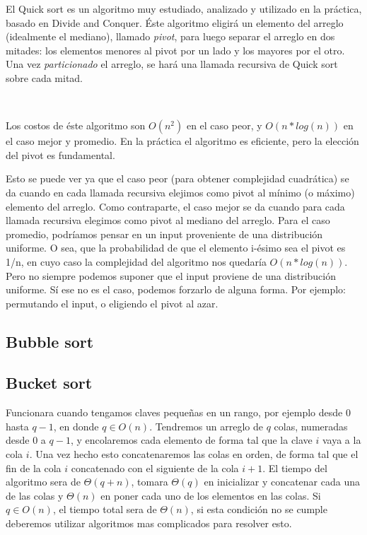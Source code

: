 El Quick sort es un algoritmo muy estudiado, analizado y utilizado en la pr\'actica, basado en Divide and Conquer.
\'Este algoritmo eligir\'a un elemento del arreglo (idealmente el mediano), llamado \textit{pivot}, para luego separar el arreglo en dos mitades: los elementos menores al pivot por un lado y los mayores por el otro. Una vez \textit{particionado} el arreglo, se har\'a una llamada recursiva de Quick sort sobre cada mitad.

~

Los costos de \'este algoritmo son $O(n^2)$ en el caso peor, y $O(n*log(n))$ en el caso mejor y promedio. En la pr\'actica el algoritmo es eficiente, pero la elecci\'on del pivot es fundamental.

Esto se puede ver ya que el caso peor (para obtener complejidad cuadr\'atica) se da cuando en cada llamada recursiva elejimos como pivot al m\'inimo (o m\'aximo) elemento del arreglo.
Como contraparte, el caso mejor se da cuando para cada llamada recursiva elegimos como pivot al mediano del arreglo.
Para el caso promedio, podr\'iamos pensar en un input proveniente de una distribuci\'on uniforme. O sea, que la probabilidad de que el elemento i-\'esimo sea el pivot es 1/n, en cuyo caso la complejidad del algoritmo nos quedar\'ia $O(n*log(n))$.
Pero no siempre podemos suponer que el input proviene de una distribuci\'on uniforme. S\'i ese no es el caso, podemos forzarlo de alguna forma. Por ejemplo: permutando el input, o eligiendo el pivot al azar.

\subsection{Bubble sort}

\subsection{Bucket sort}

Funcionara cuando tengamos claves peque\~nas en un rango, por ejemplo desde $0$ hasta $q-1$, en donde $q \in O(n)$. Tendremos un arreglo de $q$ colas, numeradas desde $0$ a $q-1$, y encolaremos cada elemento de forma tal que la clave $i$ vaya a la cola $i$. Una vez hecho esto concatenaremos las colas en orden, de forma tal que el fin de la cola $i$ concatenado con el siguiente de la cola $i+1$. El tiempo del algoritmo sera de $\Theta(q+n)$, tomara $\Theta(q)$ en inicializar y concatenar cada una de las colas y $\Theta(n)$  en poner cada uno de los elementos en las colas. Si $q \in O(n)$, el tiempo total sera de $\Theta(n)$, si esta condici\'on no se cumple deberemos utilizar algoritmos mas complicados para resolver esto.

